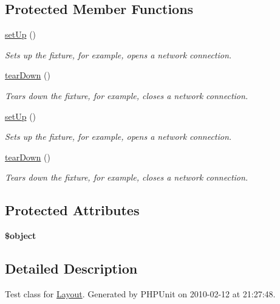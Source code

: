 \subsection*{Protected Member Functions}
\begin{DoxyCompactItemize}
\item 
\hyperlink{class_layout_test_a7bbe4d43c0d7c294623c1238cb537ede}{setUp} ()
\begin{DoxyCompactList}\small\item\em Sets up the fixture, for example, opens a network connection. \item\end{DoxyCompactList}\item 
\hyperlink{class_layout_test_a3e2ac6418ffbc0f2af0cc228399b954f}{tearDown} ()
\begin{DoxyCompactList}\small\item\em Tears down the fixture, for example, closes a network connection. \item\end{DoxyCompactList}\item 
\hyperlink{class_layout_test_a7bbe4d43c0d7c294623c1238cb537ede}{setUp} ()
\begin{DoxyCompactList}\small\item\em Sets up the fixture, for example, opens a network connection. \item\end{DoxyCompactList}\item 
\hyperlink{class_layout_test_a3e2ac6418ffbc0f2af0cc228399b954f}{tearDown} ()
\begin{DoxyCompactList}\small\item\em Tears down the fixture, for example, closes a network connection. \item\end{DoxyCompactList}\end{DoxyCompactItemize}
\subsection*{Protected Attributes}
\begin{DoxyCompactItemize}
\item 
\hypertarget{class_layout_test_a873e254715d1b7b61bc5c21d3a8bb9cb}{
{\bfseries \$object}}
\label{class_layout_test_a873e254715d1b7b61bc5c21d3a8bb9cb}

\end{DoxyCompactItemize}


\subsection{Detailed Description}
Test class for \hyperlink{class_layout}{Layout}. Generated by PHPUnit on 2010-\/02-\/12 at 21:27:48.

